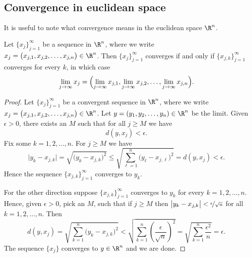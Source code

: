 \documentclass[12pt]{book}
\begin{document}
\subsection*{Convergence in euclidean space}

It is useful to note what convergence means in the euclidean space
$\R^n$.

\begin{prop} \label{prop:msconveuc}
Let $\{ x_j \}_{j=1}^\infty$ be a sequence in $\R^n$,
where we write $x_j = \bigl(x_{j,1},x_{j,2},\ldots,x_{j,n}\bigr) \in \R^n$.
Then $\{ x_j \}_{j=1}^\infty$ converges if and only if
$\{ x_{j,k} \}_{j=1}^\infty$ converges for every $k$, in which case
\begin{equation*}
\lim_{j\to\infty}
x_j =
\Bigl(
\lim_{j\to\infty} x_{j,1},
\lim_{j\to\infty} x_{j,2},
\ldots,
\lim_{j\to\infty} x_{j,n}
\Bigr) .
\end{equation*}
\end{prop}


\begin{proof}
Let $\{ x_j \}_{j=1}^\infty$ be a convergent sequence
in $\R^n$, where we write $x_j = \bigl(x_{j,1},x_{j,2},\ldots,x_{j,n}\bigr) \in \R^n$.
Let $y = (y_1,y_2,\ldots,y_n) \in \R^n$ be the limit.
Given $\epsilon > 0$, there exists an $M$ such that for all
$j \geq M$ we have
\begin{equation*}
d(y,x_j) < \epsilon.
\end{equation*}
Fix some $k=1,2,\ldots,n$.
For $j \geq M$ we have
\begin{equation*}
\bigl\lvert y_k - x_{j,k} \bigr\rvert
=
\sqrt{{\bigl(y_k - x_{j,k} \bigr)}^2}
\leq
\sqrt{\sum_{\ell=1}^n {\bigl(y_\ell-x_{j,\ell}\bigr)}^2}
= d(y,x_j) < \epsilon .
\end{equation*}
Hence the sequence $\{ x_{j,k} \}_{j=1}^\infty$ converges to $y_k$.

For the other direction suppose 
$\{ x_{j,k} \}_{j=1}^\infty$ converges to $y_k$ for every $k=1,2,\ldots,n$.
Hence, given $\epsilon > 0$, pick an $M$, such that if $j \geq M$ then 
$\bigl\lvert y_k-x_{j,k} \bigr\rvert < \nicefrac{\epsilon}{\sqrt{n}}$ for all
$k=1,2,\ldots,n$.
Then
\begin{equation*}
d(y,x_j)
=
\sqrt{\sum_{k=1}^n {\bigl(y_k-x_{j,k}\bigr)}^2}
<
\sqrt{\sum_{k=1}^n {\left(\frac{\epsilon}{\sqrt{n}}\right)}^2}
=
\sqrt{\sum_{k=1}^n \frac{{\epsilon^2}}{n}}
= \epsilon .
\end{equation*}
The sequence $\{ x_j \}$ converges to $y \in \R^n$ and we are done.
\end{proof}
\end{document}
